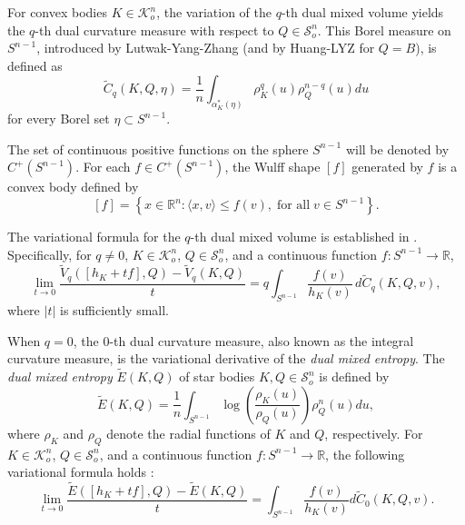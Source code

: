 \documentclass[12pt, reqno]{amsart}
\theoremstyle{definition}
\theoremstyle{remark}
\numberwithin{equation}{section}
\newcommand{\Sn}{S^{n-1}}
\newcommand{\la}{\langle}
\newcommand{\ra}{\rangle}
\begin{document}
	   
	For convex bodies $K \in \mathcal{K}_{o}^{n}$, the variation of the $q$-th dual mixed volume yields the $q$-th dual curvature measure with respect to $Q\in \mathcal{S}_{o}^{n}$. This Borel measure on $S^{n-1}$, introduced by Lutwak-Yang-Zhang \cite{lyz2018} (and by Huang-LYZ \cite{HLYZdual} for $Q = B$), is defined as
	\begin{equation}\label{defdual}
	\widetilde{C}_{q}(K, Q, \eta) = \frac{1}{n} \int_{\alpha_{K}^{*}(\eta)} \rho_{K}^{q}(u)\rho_{Q}^{n-q}(u)  du
	\end{equation}
	for every Borel set $\eta\subset\Sn$.
	
		The set of continuous positive functions on the sphere $ S^{n-1} $ will be denoted by $ C^{+}(S^{n-1}) $. For each $ f\in C^{+}(S^{n-1}) $, the Wulff shape $ [f] $ generated by $ f $ is a convex body defined by
	\begin{equation}\label{Wulff shape}
		[f]=\left\{x\in \mathbb{R}^{n}: \la x, v \ra \le f(v),\; \text{for all}\; v\in S^{n-1}\right\}.
	\end{equation}
	
	
	The variational formula for the $q$-th dual mixed volume is established in \cite{HLYZdual,lyz2018}. Specifically, for $q \neq 0$, $K \in \mathcal{K}_o^n$, $Q \in \mathcal{S}_o^n$, and a continuous function $f : S^{n-1} \to \mathbb{R}$, 
	\begin{equation}\label{dual vari}
			\lim_{t \to 0} \frac{\widetilde{V}_q([ h_K + tf], Q) - \widetilde{V}_q(K, Q)}{t} = q \int_{S^{n-1}} \frac{f(v)}{h_K(v)} \, d\widetilde{C}_q(K, Q, v),
	\end{equation}
	where $|t|$ is sufficiently small.
	
	When $q = 0$, the $0$-th dual curvature measure, also known as the integral curvature measure, is the variational derivative of the \textit{dual mixed entropy}. The \textit{dual mixed entropy} $\widetilde{E}(K, Q)$ of star bodies $K, Q \in \mathcal{S}_o^n$ is defined by \cite{lyz2018}
	\begin{equation}\label{entropy def} 
	\widetilde{E}(K, Q) = \frac{1}{n} \int_{S^{n-1}} \log \left( \frac{\rho_K(u)}{\rho_Q(u)} \right) \rho_Q^n(u)  du,
	\end{equation}
	where $\rho_K$ and $\rho_Q$ denote the radial functions of $K$ and $Q$, respectively.  For $K \in \mathcal{K}_o^n$, $Q \in \mathcal{S}_o^n$, and a continuous function $f : S^{n-1} \to \mathbb{R}$, the following variational formula holds \cite{lyz2018}:
	\begin{equation}\label{entropy vari}
	\lim_{t \to 0} \frac{\widetilde{E}([h_{K}+tf],Q) - \widetilde{E}(K,Q)}{t} = \int_{S^{n-1}} \frac{f(v)}{h_K(v)}  d\widetilde{C}_0(K,Q,v).
	\end{equation}
	
\end{document}
